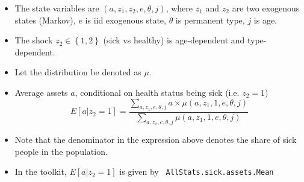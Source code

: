 \documentclass[12pt]{article}
\begin{document}
\begin{itemize}
\item The state variables are $\left( a,z_{1},z_{2},e,\theta ,j\right) $,
where $z_{1}$ and $z_{2}$ are two exogenous states (Markov), $e$ is iid
exogenous state, $\theta $ is permanent type, $j$ is age.

\item The shock $z_{2}\in \left\{ 1,2\right\} $ (sick vs healthy) is
age-dependent and type-dependent.

\item Let the distribution be denoted as $\mu $.

\item Average assets $a$, conditional on health status being sick (i.e. $%
z_{2}=1$)%
\begin{equation*}
E\left[ a|z_{2}=1\right] =\frac{\sum_{a,z_{1},e,\theta ,j}a\times \mu \left(
a,z_{1},1,e,\theta ,j\right) }{\sum_{a,z_{1},e,\theta ,j}\mu \left(
a,z_{1},1,e,\theta ,j\right) }
\end{equation*}

\item Note that the denominator in the expression above denotes the share of
sick people in the population.

\item In the toolkit, $E\left[ a|z_{2}=1\right] $ is given by \texttt{%
AllStats.sick.assets.Mean}
\end{itemize}
\end{document}
